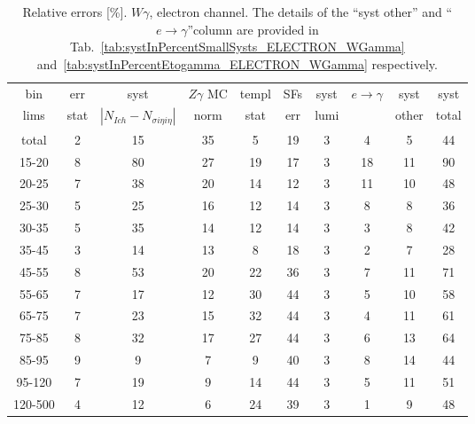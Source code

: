 \begin{table}[h]
  \scriptsize
  \begin{center}
  \caption{Relative errors [\%]. $W\gamma$, electron channel. The details of the ``syst other'' and ``$e\rightarrow\gamma$''column are provided in Tab.~\ref{tab:systInPercentSmallSysts_ELECTRON_WGamma} and~\ref{tab:systInPercentEtogamma_ELECTRON_WGamma} respectively. }
   \begin{tabular}{|c|c|c|c|c|c|c|c|c|c|}
    bin  & err & syst & $Z\gamma$ MC & templ & SFs & syst & $e\rightarrow\gamma$ & syst & syst\\
    lims  & stat & $|N_{Ich}-N_{\sigma{i\eta i\eta}}|$ & norm & stat & err & lumi &  & other & total\\ \hline
    total  & 2 & 15 & 35 & 5 & 19 & 3 & 4 & 5 & 44 \\ \hline
    15-20 & 8 & 80 & 27 & 19 & 17 & 3 & 18 & 11 & 90 \\ \hline
    20-25 & 7 & 38 & 20 & 14 & 12 & 3 & 11 & 10 & 48 \\ \hline
    25-30 & 5 & 25 & 16 & 12 & 14 & 3 & 8 & 8 & 36 \\ \hline
    30-35 & 5 & 35 & 14 & 12 & 14 & 3 & 3 & 8 & 42 \\ \hline
    35-45 & 3 & 14 & 13 & 8 & 18 & 3 & 2 & 7 & 28 \\ \hline
    45-55 & 8 & 53 & 20 & 22 & 36 & 3 & 7 & 11 & 71 \\ \hline
    55-65 & 7 & 17 & 12 & 30 & 44 & 3 & 5 & 10 & 58 \\ \hline
    65-75 & 7 & 23 & 15 & 32 & 44 & 3 & 4 & 11 & 61 \\ \hline
    75-85 & 8 & 32 & 17 & 27 & 44 & 3 & 6 & 13 & 64 \\ \hline
    85-95 & 9 & 9 & 7 & 9 & 40 & 3 & 8 & 14 & 44 \\ \hline
    95-120 & 7 & 19 & 9 & 14 & 44 & 3 & 5 & 11 & 51 \\ \hline
    120-500 & 4 & 12 & 6 & 24 & 39 & 3 & 1 & 9 & 48 \\ \hline
  \end{tabular}
  \label{tab:systInPercent_ELECTRON_WGamma}
  \end{center}
\end{table}


